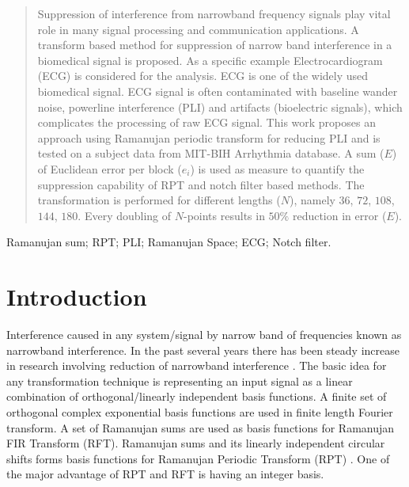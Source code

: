 \documentclass[conference]{IEEEtran}
\begin{document}
\begin{abstract}
Suppression of interference from narrowband frequency signals play vital role in many signal processing and communication applications. A transform based method for suppression of narrow band interference in a biomedical signal is proposed. As a specific example Electrocardiogram (ECG) is considered for the analysis. ECG is one of the widely used biomedical signal. ECG signal is often contaminated with baseline wander noise, powerline interference (PLI) and artifacts (bioelectric signals), which complicates the processing of raw ECG signal. This work proposes an approach using Ramanujan periodic transform for reducing PLI and is tested on a subject data from MIT-BIH Arrhythmia database. A sum ($E$) of Euclidean error per block ($e_i$) is used as measure to quantify the suppression capability of RPT and notch filter based methods. The transformation is performed for different lengths ($N$), namely $36$, $72$, $108$, $144$, $180$. Every doubling of $N$-points results in  $50{\%}$ reduction in error ($E$). 
\end{abstract}
\begin{IEEEkeywords}
 Ramanujan sum; RPT; PLI; Ramanujan Space; ECG; Notch filter.
\end{IEEEkeywords}
%
\IEEEpeerreviewmaketitle
\section{Introduction}
Interference caused in any system/signal by narrow band of frequencies known as narrowband interference. In the past several years there has been steady increase in research involving reduction of narrowband interference \cite{1094725}. The basic idea for any transformation technique is representing an input signal as a linear combination of orthogonal/linearly independent basis functions. A finite set of orthogonal complex exponential basis functions are used in finite length Fourier transform. A set of Ramanujan sums are used as basis functions for Ramanujan FIR Transform (RFT). Ramanujan sums and its linearly independent circular shifts forms basis functions for Ramanujan Periodic Transform (RPT) \cite{6839030}. One of the major advantage of RPT and RFT is having an integer basis.
\end{document}
